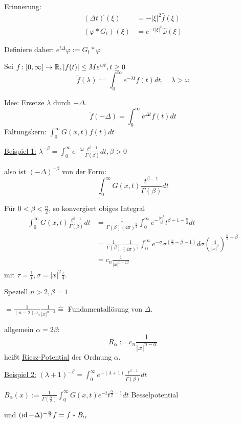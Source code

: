 Erinnerung: 
\begin{align*}
  (\Delta t)^{\hat{}}(\xi) &= -|\xi|^2 \hat f(\xi) \\
  (\varphi \ast G_t)^{\hat{}}(\xi) &= e^{-t|\xi|^2} \hat \varphi(\xi)
\end{align*}

Definiere daher: $e^{t\Delta} \varphi := G_t \ast \varphi$

Sei $f \colon [0, \infty] \to \mathbb{R}, |f(t)| \leq M e^{wt}, t \geq 0$
$$
  \tilde f(\lambda) := \int_0^\infty e^{-\lambda t} f(t) dt, \quad \lambda > \omega
$$

Idee: Ersetze $\lambda$ durch $-\Delta$.
$$
\tilde f(-\Delta) = \int_0^\infty e^{\Delta t} f(t) dt
$$
{\tiny{Faltungskern: $\int_0^\infty G(x,t) f(t) dt$}}

\underline{Beispiel 1:} $\lambda^{-\beta} = \int_0^\infty e^{-\lambda t} \frac{t^{\beta - 1}}{\Gamma(\beta)} dt, \beta > 0$

also ist $ (-\Delta)^{-\beta}$ von der Form:
$$
\int_0^\infty G(x, t) \frac{t^{\beta - 1}}{\Gamma(\beta)} dt
$$

Für $0 < \beta < \frac{n}{2}$, so konvergiert obiges Integral
\begin{align*}
  \int_0^\infty G(x,t) \frac{t^{\beta - 1}}{\Gamma(\beta)} dt 
  &= \frac{1}{\Gamma(\beta)(4\pi)^{\frac{n}{2}}} \int_0^\infty e^{-\frac{|x|^2}{4t}} t^{\beta - 1 - \frac{n}{2}} dt \\
  &= \frac{1}{\Gamma(\beta)} \frac{1}{(4\pi)^{\frac{n}{2}}} \int_0^\infty e^{-\sigma}\sigma^{(\frac{n}{2} - \beta - 1)} d\sigma \left(\frac{4}{|x|^2}\right)^{\frac{n}{2}- \beta} \\
  &= c_n \frac{1}{|x|^{n - 2\beta}}
\end{align*}
 mit $\tau = \frac{1}{t}, \sigma = |x|^2 \frac{\tau}{4}$.

Speziell $n > 2, \beta = 1$

$= \frac{1}{(n - 2) \omega_n} \frac{1}{|x|^{n - 2}} \hat = $ Fundamentallösung von $\Delta$.

allgemein $\alpha = 2\beta:$
$$
R_\alpha := c_n \frac{1}{|x|^{n - \alpha}}
$$
heißt \underline{Riesz-Potential} der Ordnung $\alpha$.

\underline{Beispiel 2:} $(\lambda + 1)^{-\beta} = \int_0^\infty e^{-(\lambda + 1)} \frac{t^{\beta - 1}}{\Gamma(\beta)} dt$

$B_\alpha(x) := \frac{1}{\Gamma(\frac{\alpha}{2})} \int_0^\infty G(x,t) e^{-t} t^{\frac{\alpha}{2} - 1} dt$ Besselpotential

und $(\operatorname{id} - \Delta)^{-\frac{\alpha}{2}} f = f \ast B_\alpha$


